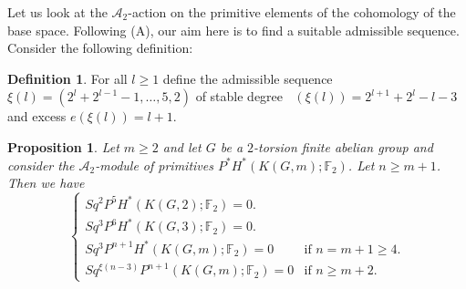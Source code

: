 \documentclass{amsart}
\newtheorem{prop}[thm]{Proposition}
\theoremstyle{definition}
\newtheorem{defn}[thm]{Definition}
\theoremstyle{remark}
\DeclareMathOperator{\degst}{deg_{st}}
\newcommand{\F}{\mathbb{F}}
\newcommand{\A}{\mathcal{A}}
\renewcommand{\geq}{\geqslant}
\begin{document}
Let us look at the $\A_2$-action on the primitive elements of the cohomology of the base space. Following (A), our aim here is to find a suitable admissible sequence. Consider the following definition:

\begin{defn}
For all $l\geq1$ define the admissible sequence $\xi(l)=(2^l+2^{l-1}-1,\dots,5,2)$ of stable degree $\degst(\xi(l))=2^{l+1}+2^l-l-3$ and excess $e(\xi(l))=l+1$.
\end{defn}

\begin{prop}
Let $m\geq2$ and let $G$ be a $2$-torsion finite abelian group and consider the $\A_2$-module of primitives $P^*H^*(K(G,m);\F_2)$. Let $n\geq m+1$. Then we have
$$
\begin{cases}
Sq^2P^5H^*(K(G,2);\F_2)=0.\\
Sq^3P^6H^*(K(G,3);\F_2)=0.\\
Sq^{3}P^{n+1}H^*(K(G,m);\F_2)=0 &\text{if $n=m+1\geq4$.}\\
Sq^{\xi(n-3)}P^{n+1}(K(G,m);\F_2)=0 &\text{if $n\geq m+2$.}
\end{cases}
$$
\end{prop}
\end{document}
